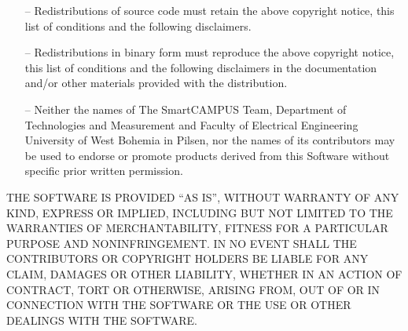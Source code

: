 \begin{itemize}
    \item[--] Redistributions of source code must retain the above copyright notice, this list of conditions and the following disclaimers.
    \item[--] Redistributions in binary form must reproduce the above copyright notice, this list of conditions and the following disclaimers in the documentation and/or other materials provided with the distribution.
    \item[--] Neither the names of The SmartCAMPUS Team, Department of Technologies and Measurement and Faculty of Electrical Engineering University of West Bohemia in Pilsen, nor the names of its contributors may be used to endorse or promote products derived from this Software without specific prior written permission. 
\end{itemize}
THE SOFTWARE IS PROVIDED “AS IS”, WITHOUT WARRANTY OF ANY KIND, EXPRESS OR IMPLIED, INCLUDING BUT NOT LIMITED TO THE WARRANTIES OF MERCHANTABILITY, FITNESS FOR A PARTICULAR PURPOSE AND NONINFRINGEMENT. IN NO EVENT SHALL THE CONTRIBUTORS OR COPYRIGHT HOLDERS BE LIABLE FOR ANY CLAIM, DAMAGES OR OTHER LIABILITY, WHETHER IN AN ACTION OF CONTRACT, TORT OR OTHERWISE, ARISING FROM, OUT OF OR IN CONNECTION WITH THE SOFTWARE OR THE USE OR OTHER DEALINGS WITH THE SOFTWARE. 


